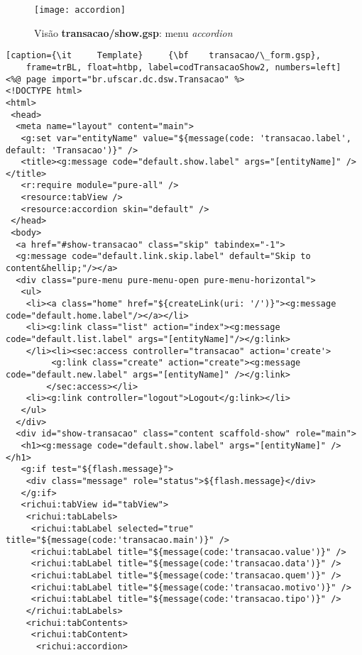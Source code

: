 \vspace{0.5cm}

\begin{figure}[htbp]
\centering
\texttt{[image: accordion]}
\caption{Visão {\bf transacao/show.gsp}: menu {\it accordion}}
\label{accordionFig}
\end{figure}

\vspace{0.5cm}

\begin{lstlisting}[caption={\it     Template}     {\bf    transacao/\_form.gsp},
    frame=trBL, float=htbp, label=codTransacaoShow2, numbers=left]
<%@ page import="br.ufscar.dc.dsw.Transacao" %>
<!DOCTYPE html>
<html>
 <head>
  <meta name="layout" content="main">
   <g:set var="entityName" value="${message(code: 'transacao.label', default: 'Transacao')}" />
   <title><g:message code="default.show.label" args="[entityName]" /></title>
   <r:require module="pure-all" />
   <resource:tabView />
   <resource:accordion skin="default" />
 </head>
 <body>
  <a href="#show-transacao" class="skip" tabindex="-1">
  <g:message code="default.link.skip.label" default="Skip to content&hellip;"/></a>
  <div class="pure-menu pure-menu-open pure-menu-horizontal">
   <ul>
    <li><a class="home" href="${createLink(uri: '/')}"><g:message code="default.home.label"/></a></li>
    <li><g:link class="list" action="index"><g:message code="default.list.label" args="[entityName]"/></g:link>
    </li><li><sec:access controller="transacao" action='create'>
         <g:link class="create" action="create"><g:message code="default.new.label" args="[entityName]" /></g:link>
        </sec:access></li>
    <li><g:link controller="logout">Logout</g:link></li>
   </ul>
  </div>
  <div id="show-transacao" class="content scaffold-show" role="main">
   <h1><g:message code="default.show.label" args="[entityName]" /></h1>
   <g:if test="${flash.message}">
    <div class="message" role="status">${flash.message}</div>
   </g:if>
   <richui:tabView id="tabView">
    <richui:tabLabels>
     <richui:tabLabel selected="true" title="${message(code:'transacao.main')}" />
     <richui:tabLabel title="${message(code:'transacao.value')}" />
     <richui:tabLabel title="${message(code:'transacao.data')}" />
     <richui:tabLabel title="${message(code:'transacao.quem')}" />
     <richui:tabLabel title="${message(code:'transacao.motivo')}" />
     <richui:tabLabel title="${message(code:'transacao.tipo')}" />
    </richui:tabLabels>
    <richui:tabContents>
     <richui:tabContent>
      <richui:accordion>

\end{lstlisting}
